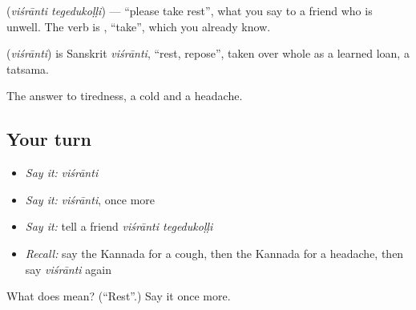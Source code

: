 \textbf{ } (\emph{viśrānti tegedukoḷḷi}) — \textquotedblleft{}please take rest\textquotedblright{}, what you say to a friend who is unwell. The verb is \textbf{}, \textquotedblleft{}take\textquotedblright{}, which you already know.

\begin{cousinweb}
\textbf{} (\emph{viśrānti}) is Sanskrit \emph{viśrānti}, \textquotedblleft{}rest, repose\textquotedblright{}, taken over whole as a learned loan, a tatsama.
\end{cousinweb}

\begin{grammarlens}[title={What you've built}]
The answer to tiredness, a cold and a headache.
\end{grammarlens}

\subsection*{Your turn}
\begin{itemize}
\raggedright
  \item \emph{Say it:} \emph{viśrānti}
  \item \emph{Say it:} \emph{viśrānti}, once more
  \item \emph{Say it:} tell a friend \emph{viśrānti tegedukoḷḷi}
  \item \emph{Recall:} say the Kannada for a cough, then the Kannada for a headache, then say \emph{viśrānti} again
\end{itemize}

\begin{tcolorbox}[breakable,colback=teal!4,colframe=teal!35!black,title={Before you move on}]
What does  mean? (\textquotedblleft{}Rest\textquotedblright{}.) Say it once more.
\end{tcolorbox}
